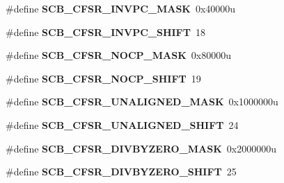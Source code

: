 \begin{DoxyCompactItemize}
\item 
\hypertarget{group___s_c_b___register___masks_gaae40b2a5f96ec0bf9cd3e8fbe5114ab0}{}\#define {\bfseries S\+C\+B\+\_\+\+C\+F\+S\+R\+\_\+\+I\+N\+V\+P\+C\+\_\+\+M\+A\+S\+K}~0x40000u\label{group___s_c_b___register___masks_gaae40b2a5f96ec0bf9cd3e8fbe5114ab0}

\item 
\hypertarget{group___s_c_b___register___masks_ga94b0f3895b46caa23c4e82d523e82079}{}\#define {\bfseries S\+C\+B\+\_\+\+C\+F\+S\+R\+\_\+\+I\+N\+V\+P\+C\+\_\+\+S\+H\+I\+F\+T}~18\label{group___s_c_b___register___masks_ga94b0f3895b46caa23c4e82d523e82079}

\item 
\hypertarget{group___s_c_b___register___masks_ga1579d6843c18b5b68c5348f81b3f385d}{}\#define {\bfseries S\+C\+B\+\_\+\+C\+F\+S\+R\+\_\+\+N\+O\+C\+P\+\_\+\+M\+A\+S\+K}~0x80000u\label{group___s_c_b___register___masks_ga1579d6843c18b5b68c5348f81b3f385d}

\item 
\hypertarget{group___s_c_b___register___masks_ga9b41faeca5c5cd2a9da520f63d0497be}{}\#define {\bfseries S\+C\+B\+\_\+\+C\+F\+S\+R\+\_\+\+N\+O\+C\+P\+\_\+\+S\+H\+I\+F\+T}~19\label{group___s_c_b___register___masks_ga9b41faeca5c5cd2a9da520f63d0497be}

\item 
\hypertarget{group___s_c_b___register___masks_ga8a4e7a6f895fa22ee626cf57cf4a5531}{}\#define {\bfseries S\+C\+B\+\_\+\+C\+F\+S\+R\+\_\+\+U\+N\+A\+L\+I\+G\+N\+E\+D\+\_\+\+M\+A\+S\+K}~0x1000000u\label{group___s_c_b___register___masks_ga8a4e7a6f895fa22ee626cf57cf4a5531}

\item 
\hypertarget{group___s_c_b___register___masks_ga4a2611b58c06fa7ab82d111d552f0303}{}\#define {\bfseries S\+C\+B\+\_\+\+C\+F\+S\+R\+\_\+\+U\+N\+A\+L\+I\+G\+N\+E\+D\+\_\+\+S\+H\+I\+F\+T}~24\label{group___s_c_b___register___masks_ga4a2611b58c06fa7ab82d111d552f0303}

\item 
\hypertarget{group___s_c_b___register___masks_gad8ad002c8204ce09b7a3e3a74b0048be}{}\#define {\bfseries S\+C\+B\+\_\+\+C\+F\+S\+R\+\_\+\+D\+I\+V\+B\+Y\+Z\+E\+R\+O\+\_\+\+M\+A\+S\+K}~0x2000000u\label{group___s_c_b___register___masks_gad8ad002c8204ce09b7a3e3a74b0048be}

\item 
\hypertarget{group___s_c_b___register___masks_ga519b9a8ac1c1f24e97173b846c92c3d7}{}\#define {\bfseries S\+C\+B\+\_\+\+C\+F\+S\+R\+\_\+\+D\+I\+V\+B\+Y\+Z\+E\+R\+O\+\_\+\+S\+H\+I\+F\+T}~25\label{group___s_c_b___register___masks_ga519b9a8ac1c1f24e97173b846c92c3d7}


\end{DoxyCompactItemize}
